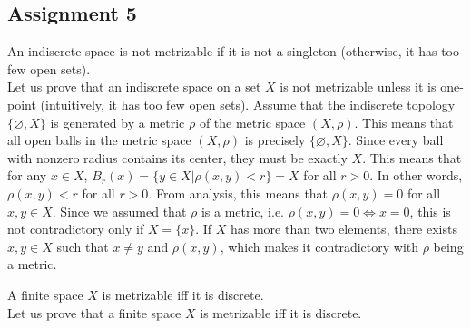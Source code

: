 \documentclass[document]{article}
\begin{document}
\subsection{Assignment 5}

\begin{problem}[4.J] An indiscrete space is not metrizable if it is not a singleton (otherwise, it has too few open sets). \\


Let us prove that an indiscrete space on a set $X$ is not metrizable unless it is one-point (intuitively, it has too few open sets). Assume that the indiscrete topology $\{\varnothing, X\}$ is generated by a metric $\rho$ of the metric space $(X,\rho)$. This means that all open balls in the metric space $(X, \rho)$ is precisely $\{\varnothing, X\}$. Since every ball with nonzero radius contains its center, they must be exactly $X$. This means that for any $x\in X$, $B_r(x) = \{y\in X| \rho(x,y)<r\}=X$ for all $r>0$. In other words, $\rho(x,y) <r$ for all $r>0$. From analysis, this means that $\rho(x,y)=0$ for all $x,y \in X$. Since we assumed that $\rho$ is a metric, i.e. $\rho(x,y)=0 \iff x=0$, this is not contradictory only if $X=\{x\}$. If $X$ has more than two elements, there exists $x,y\in X$ such that $x\neq y$ and $\rho(x,y)$, which makes it contradictory with $\rho$ being a metric.
\end{problem}

\begin{problem}[4.K]A finite space $X$ is metrizable iff it is discrete.\\


Let us prove that a finite space $X$ is metrizable iff it is discrete.
\end{problem}
\end{document}
